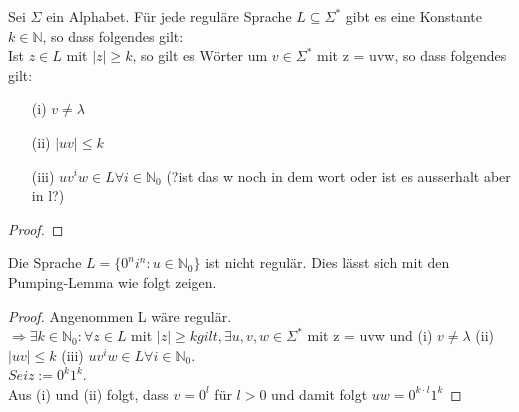   Sei \(\Sigma\) ein Alphabet. Für jede reguläre Sprache \(L \subseteq \Sigma^*\) gibt es eine Konstante \(k \in \mathbb{N}\), so dass folgendes gilt:\\ Ist \(z \in L\) mit \(|z| \geq k\), so gilt es Wörter um \(v \in \Sigma^*\) mit z = uvw, so dass folgendes gilt:
  \begin{itemize}
    \item [(i)]\(v \not = \lambda\)
    \item [(ii)]\(|uv| \leq k\)
    \item [(iii)]\(uv^iw \in L \forall i \in \mathbb{N}_0\) (?ist das w noch in dem wort oder ist es ausserhalt aber in l?)
  \end{itemize} 
  \begin{proof}
  \end{proof}

    Die Sprache \(L = \{0^n i^n : u \in \mathbb{N}_0\}\) ist nicht regulär. Dies lässt sich mit den Pumping-Lemma wie folgt zeigen.

    \begin{proof}
      Angenommen L wäre regulär.\\
      \(\Rightarrow \exists k \in \mathbb{N}_0 : \forall z \in L\) mit \(|z| \geq k gilt, \exists u, v, w \in \Sigma^*\) mit z = uvw und (i) \(v \not = \lambda\) (ii) \(|uv| \leq k\) (iii) \(uv^i w \in L \forall i \in \mathbb{N}_0\). \\ \(Sei z:= 0^k 1^k\). \\Aus (i) und (ii) folgt, dass \(v = 0^l\) für \(l > 0\) und damit folgt \(uw = 0^{k\cdot l} 1^k\)
    \end{proof}
  
